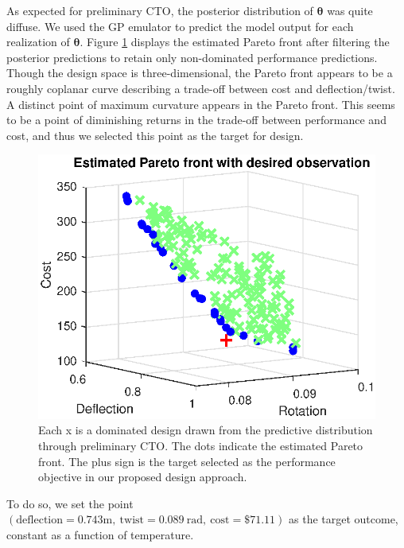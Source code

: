 \documentclass[twocolumn,10pt]{asme2ej}
\begin{document}
%
As expected for preliminary CTO, the posterior distribution of $\boldsymbol\theta$ was quite diffuse.
%
We used the GP emulator to predict the model output for each realization of $\boldsymbol \theta$.
%
Figure \ref{fig:elbow} displays the estimated Pareto front after filtering the posterior predictions to retain only non-dominated performance predictions.
%
Though the design space is three-dimensional, the Pareto front appears to be a roughly coplanar curve describing a trade-off between cost and deflection/twist.
%
A distinct point of maximum curvature appears in the Pareto front. 
%
This seems to be a point of diminishing returns in the trade-off between performance and cost, and thus we selected this point as the target for design.
%
\begin{figure}
	\centering
	\includegraphics[scale=0.85]{FIG_est_PF_with_des_obs.eps}
	\caption{Each x is a dominated design drawn from the predictive distribution through preliminary CTO. The dots indicate the estimated Pareto front. The plus sign is the target selected as the performance objective in our proposed design approach.}
	\label{fig:elbow}
\end{figure}
%
To do so, we set the point $(\mathrm{deflection}=0.743\mathrm m,\ 
\mathrm{twist}=0.089\ \mathrm{rad},\ 
\mathrm{cost}=\$71.11)$
as the target outcome, constant as a function of temperature.
%
\end{document}
